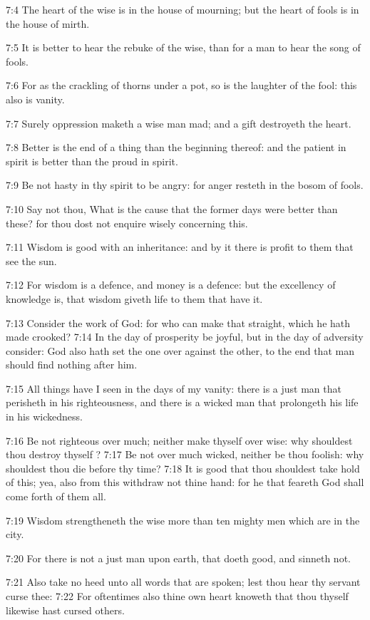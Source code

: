 7:4 The heart of the wise is in the house of mourning; but the heart of fools is in the house of mirth.

7:5 It is better to hear the rebuke of the wise, than for a man to hear the song of fools.

7:6 For as the crackling of thorns under a pot, so is the laughter of the fool: this also is vanity.

7:7 Surely oppression maketh a wise man mad; and a gift destroyeth the heart.

7:8 Better is the end of a thing than the beginning thereof: and the patient in spirit is better than the proud in spirit.

7:9 Be not hasty in thy spirit to be angry: for anger resteth in the bosom of fools.

7:10 Say not thou, What is the cause that the former days were better than these? for thou dost not enquire wisely concerning this.

7:11 Wisdom is good with an inheritance: and by it there is profit to them that see the sun.

7:12 For wisdom is a defence, and money is a defence: but the excellency of knowledge is, that wisdom giveth life to them that have it.

7:13 Consider the work of God: for who can make that straight, which he hath made crooked?  7:14 In the day of prosperity be joyful, but in the day of adversity consider: God also hath set the one over against the other, to the end that man should find nothing after him.

7:15 All things have I seen in the days of my vanity: there is a just man that perisheth in his righteousness, and there is a wicked man that prolongeth his life in his wickedness.

7:16 Be not righteous over much; neither make thyself over wise: why shouldest thou destroy thyself ?  7:17 Be not over much wicked, neither be thou foolish: why shouldest thou die before thy time?  7:18 It is good that thou shouldest take hold of this; yea, also from this withdraw not thine hand: for he that feareth God shall come forth of them all.

7:19 Wisdom strengtheneth the wise more than ten mighty men which are in the city.

7:20 For there is not a just man upon earth, that doeth good, and sinneth not.

7:21 Also take no heed unto all words that are spoken; lest thou hear thy servant curse thee: 7:22 For oftentimes also thine own heart knoweth that thou thyself likewise hast cursed others.

